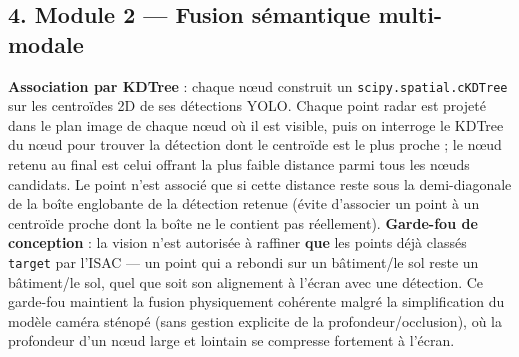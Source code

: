 \documentclass[11pt]{article}
\begin{document}
    \subsection{4. Module 2 --- Fusion sémantique
multi-modale}\label{module-2-fusion-suxe9mantique-multi-modale}

\textbf{Association par KDTree} : chaque nœud construit un
\texttt{scipy.spatial.cKDTree} sur les centroïdes 2D de ses détections
YOLO. Chaque point radar est projeté dans le plan image de chaque nœud
où il est visible, puis on interroge le KDTree du nœud pour trouver la
détection dont le centroïde est le plus proche ; le nœud retenu au final
est celui offrant la plus faible distance parmi tous les nœuds
candidats. Le point n'est associé que si cette distance reste sous la
demi-diagonale de la boîte englobante de la détection retenue (évite
d'associer un point à un centroïde proche dont la boîte ne le contient
pas réellement). \textbf{Garde-fou de conception} : la vision n'est
autorisée à raffiner \textbf{que} les points déjà classés
\texttt{target} par l'ISAC --- un point qui a rebondi sur un bâtiment/le
sol reste un bâtiment/le sol, quel que soit son alignement à l'écran
avec une détection. Ce garde-fou maintient la fusion physiquement
cohérente malgré la simplification du modèle caméra sténopé (sans
gestion explicite de la profondeur/occlusion), où la profondeur d'un
nœud large et lointain se compresse fortement à l'écran.
\end{document}
